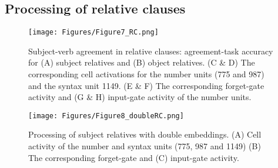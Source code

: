 
\subsection{Processing of relative clauses}
\lipsum[1]

\begin{figure*}[t]
\centering
\texttt{[image: Figures/Figure7\_RC.png]}
\caption{Subject-verb agreement in relative clauses: agreement-task accuracy for (A) subject relatives and (B) object relatives. (C \& D) The corresponding cell activations for the number units (775 and 987) and the syntax unit 1149. (E \& F) The corresponding forget-gate activity and (G \& H) input-gate activity of the number units. }
\end{figure*}

\lipsum[1]

\begin{figure}[b]
\centering
\texttt{[image: Figures/Figure8\_doubleRC.png]}
\caption{Processing of subject relatives with double embeddings. (A) Cell activity of the number and syntax units (775, 987 and 1149) (B) The corresponding forget-gate and (C) input-gate activity.}
\end{figure}
